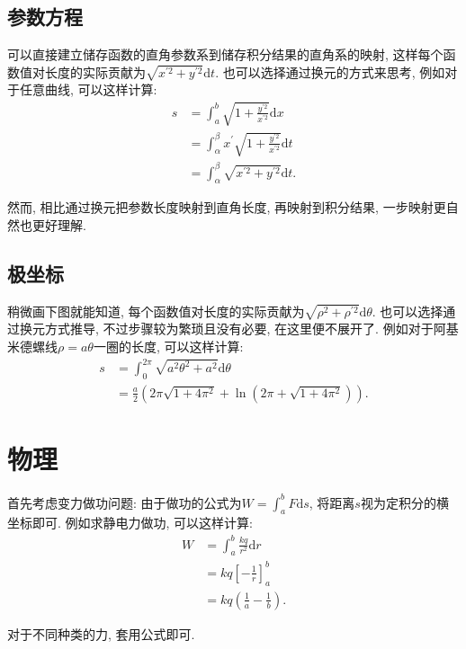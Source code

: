 \documentclass[UTF8,a4paper,11pt]{ctexart}
\begin{document}
    \subsection{参数方程}
      可以直接建立储存函数的直角参数系到储存积分结果的直角系的映射,
      这样每个函数值对长度的实际贡献为$\sqrt{x^{\prime 2}+y^{\prime 2}}\mathrm{d}t$.
      也可以选择通过换元的方式来思考,
      例如对于任意曲线,
      可以这样计算:
      \[
      \begin{aligned}
        s&=\int_{a}^{b}\sqrt{1+\frac{y^{\prime 2}}{x^{\prime 2}}}\mathrm{d}x
        \\&=\int_{\alpha}^{\beta}x^{\prime}\sqrt{1+\frac{y^{\prime 2}}{x^{\prime 2}}}\mathrm{d}t
        \\&=\int_{\alpha}^{\beta}\sqrt{x^{\prime 2}+y^{\prime 2}}\mathrm{d}t
      .\end{aligned}
      \]
      
      然而, 相比通过换元把参数长度映射到直角长度, 再映射到积分结果,
      一步映射更自然也更好理解.

    \subsection{极坐标}
      稍微画下图就能知道,
      每个函数值对长度的实际贡献为$\sqrt{\rho^{2}+\rho^{\prime 2}}\mathrm{d}\theta$.
      也可以选择通过换元方式推导,
      不过步骤较为繁琐且没有必要, 在这里便不展开了.
      例如对于阿基米德螺线$\rho=a \theta$一圈的长度,
      可以这样计算:
      \[
      \begin{aligned}
        s&=\int_{0}^{2\pi}\sqrt{a^{2}\theta^{2}+a^{2}}\mathrm{d}\theta
        \\&=\frac{a}{2}\left(2\pi\sqrt{1+4\pi^{2}}+\ln\left(2\pi+\sqrt{1+4\pi^{2}}\right)\right)
      .\end{aligned}
      \]
  \section{物理}
    首先考虑变力做功问题:
    由于做功的公式为$W=\int_{a}^{b}F\mathrm{d}s$,
    将距离$s$视为定积分的横坐标即可.
    例如求静电力做功,
    可以这样计算:
    \[
    \begin{aligned}
      W&=\int_{a}^{b}\frac{kq}{r^{2}}\mathrm{d}r
      \\&=kq\left[-\frac{1}{r}\right]_{a}^{b}
      \\&=kq\left(\frac{1}{a}-\frac{1}{b}\right)
    .\end{aligned}
    \]
    
    对于不同种类的力, 套用公式即可.
\end{document}
